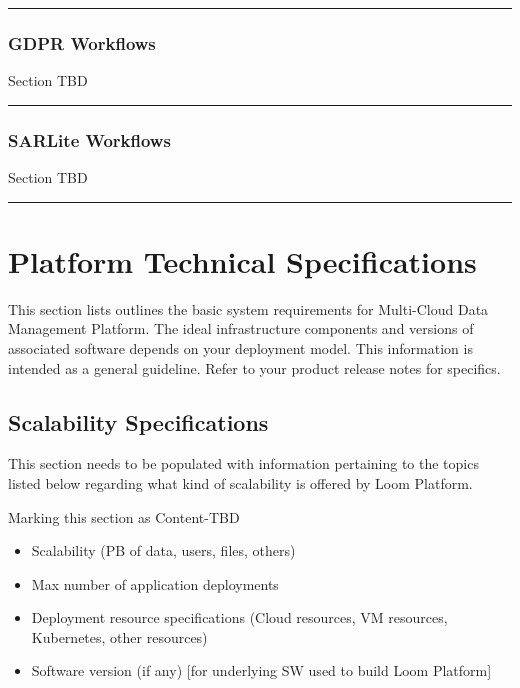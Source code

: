 \documentclass[letterpaper,10pt,english]{sphinxmanual}
\begin{document}
\bigskip\hrule\bigskip



\subsection{GDPR  Workflows}
\label{\detokenize{loom_getting_started_guide:usage-wf-gdpr}}\label{\detokenize{loom_getting_started_guide:gdpr-workflows}}
Section TBD


\bigskip\hrule\bigskip



\subsection{SARLite Workflows}
\label{\detokenize{loom_getting_started_guide:sarlite-workflows}}\label{\detokenize{loom_getting_started_guide:usage-wf-sarlite}}
Section TBD


\bigskip\hrule\bigskip



\chapter{Platform Technical Specifications}
\label{\detokenize{loom_getting_started_guide:content-platform-tech-specs}}\label{\detokenize{loom_getting_started_guide:platform-technical-specifications}}
This section lists outlines the basic system requirements for Multi-Cloud Data Management Platform. The ideal infrastructure components and versions of associated software depends on your deployment model. This information is intended as a general guideline.  Refer to your product release notes for specifics.


\section{Scalability Specifications}
\label{\detokenize{loom_getting_started_guide:content-mcdmp-scalability-specs}}\label{\detokenize{loom_getting_started_guide:scalability-specifications}}
This section needs to be populated with information pertaining to the topics listed below regarding what kind of scalability is offered by Loom Platform.

Marking this section as Content-TBD
\begin{itemize}
\item {} 
Scalability (PB of data, users, files, others)

\item {} 
Max number of application deployments

\item {} 
Deployment resource specifications (Cloud resources, VM resources, Kubernetes, other resources)

\item {} 
Software version (if any) {[}for underlying SW used to build Loom Platform{]}

\end{itemize}
\end{document}

